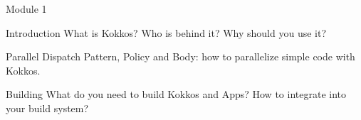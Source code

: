 \begin{frame}{Module 1}
  \begin{block}{Introduction}
    What is Kokkos? Who is behind it? Why should you use it?
  \end{block}

  \begin{block}{Parallel Dispatch}
    Pattern, Policy and Body: how to parallelize simple code with Kokkos.
  \end{block}

  \begin{block}{Building}
    What do you need to build Kokkos and Apps? How to integrate into your build system?
  \end{block}

\end{frame}
